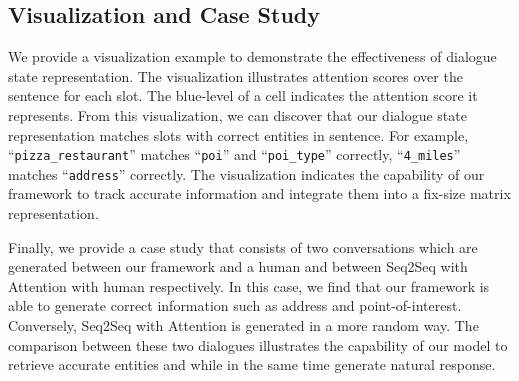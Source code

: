 \documentclass[11pt]{article}
\begin{document}
\begin{table}

\end{table}
\subsection{Visualization and Case Study}
We provide a visualization example to demonstrate the effectiveness of dialogue state representation. 
The visualization illustrates attention scores over the sentence for each slot. The blue-level of a cell indicates the attention score it represents.
From this visualization, we can discover that our dialogue state representation matches slots with correct entities in sentence. 
For example, ``\texttt{pizza\_restaurant}'' matches ``\texttt{poi}'' and 
``\texttt{poi\_type}'' correctly, ``\texttt{4\_miles}'' matches ``\texttt{address}'' correctly. The visualization indicates the capability of our framework to track accurate information and integrate them into a fix-size matrix representation.

Finally, we provide a case study that consists of two conversations which are generated between our framework and a human and between Seq2Seq with Attention with human respectively. In this case, we find that our framework is able to generate correct information such as address and point-of-interest. Conversely, Seq2Seq with Attention is generated in a more random way. The comparison between these two dialogues illustrates the capability of our model to retrieve accurate entities and while in the same time generate natural response.
\end{document}

